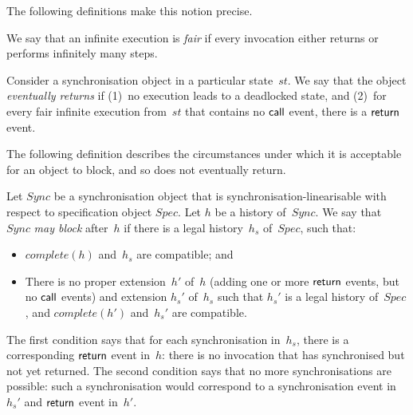 The following definitions make this notion precise.
%
\begin{definition}
We say that an infinite execution is \emph{fair} if every invocation either
returns or performs infinitely many steps.

Consider a synchronisation object in a particular state~$st$.  We say that the
object \emph{eventually returns} if (1)~no execution leads to a deadlocked
state, and (2)~for every fair infinite execution
from~$st$ that contains no $\mathsf{call}$ event, there is a $\mathsf{return}$ event.
\end{definition}
%






The following definition describes the circumstances under which it is
acceptable for an object to block, and so does not eventually return.
%
\begin{definition}
Let $Sync$ be a synchronisation object that is synchronisation-linearisable
with respect to specification object $Spec$.  Let $h$ be a history of~$Sync$.
We say that $Sync$ \emph{may block} after~$h$ if there is a legal
history~$h_s$ of~$Spec$, such that:
%
\begin{itemize}
\item $complete(h)$ and~$h_s$ are compatible; and

\item There is no proper extension~$h'$ of~$h$ (adding one or more $\mathsf{return}$
  events, but no $\mathsf{call}$ events) and extension $h_s'$ of~$h_s$ such that
  $h_s'$ is a legal history of~$Spec$, and $complete(h')$ and~$h_s'$ are
  compatible.
\end{itemize}
\end{definition}
%
The first condition says that for each synchronisation in~$h_s$,
there is a corresponding $\mathsf{return}$ event in~$h$: there is no invocation that
has synchronised but not yet returned.  The second condition says that no more
synchronisations are possible: such a synchronisation would correspond to a
synchronisation event in~$h_s'$ and $\mathsf{return}$ event in~$h'$.

